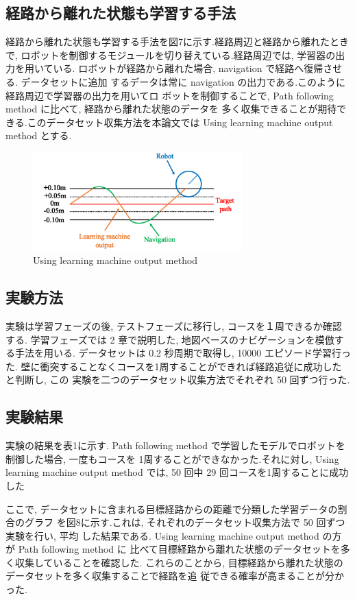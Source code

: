 \documentclass{jarticle}
\begin{document}
\subsection{経路から離れた状態も学習する手法}
経路から離れた状態も学習する手法を図7に示す.経路周辺と経路から離れたときで, 
ロボットを制御するモジュールを切り替えている.経路周辺では, 学習器の出力を用いている.
ロボットが経路から離れた場合,  navigation で経路へ復帰させる. データセットに追加
するデータは常に navigation の出力である.このように経路周辺で学習器の出力を用いてロ
ボットを制御することで,  Path following method に比べて, 経路から離れた状態のデータを
多く収集できることが期待できる.このデータセット収集方法を本論文では Using learning
machine output method とする.

\begin{figure}[h!]
  \centering
   \includegraphics[height=38mm]{./figs/dl_use.png}
   \caption{Using learning machine output method}
\end{figure}

\subsection{実験方法}
実験は学習フェーズの後, テストフェーズに移行し, コースを１周できるか確認する.
学習フェーズでは 2 章で説明した, 地図ベースのナビゲーションを模倣する手法を用いる.
データセットは 0.2 秒周期で取得し,  10000 エピソード学習行った.
壁に衝突することなくコースを1周することができれば経路追従に成功したと判断し, この
実験を二つのデータセット収集方法でそれぞれ 50 回ずつ行った.

\subsection{実験結果}
実験の結果を表1に示す. Path following method で学習したモデルでロボットを
制御した場合, 一度もコースを 1周することができなかった.それに対し, Using learning
machine output method では,  50 回中 29 回コースを1周することに成功した

ここで, データセットに含まれる目標経路からの距離で分類した学習データの割合のグラフ
を図8に示す.これは, それぞれのデータセット収集方法で 50 回ずつ実験を行い, 平均
した結果である. Using learning machine output method の方が Path following method に
比べて目標経路から離れた状態のデータセットを多く収集していることを確認した.
これらのことから, 目標経路から離れた状態のデータセットを多く収集することで経路を追
従できる確率が高まることが分かった.
\end{document}
